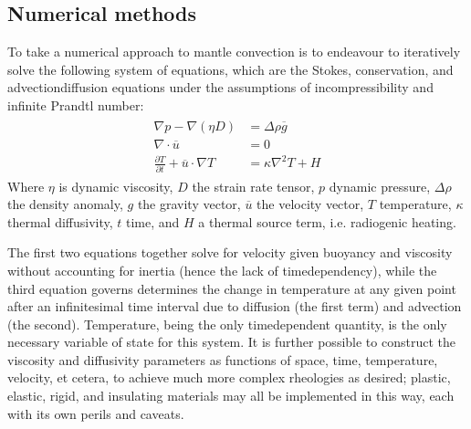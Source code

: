 \documentclass[letterpaper,10pt,english]{jupyterBook}
\begin{document}
\subsection{Numerical methods}
\label{\detokenize{content/chapter_02_methods/section2:numerical-methods}}
\sphinxAtStartPar
To take a numerical approach to mantle convection is to endeavour to iteratively solve the following system of equations, which are the Stokes, conservation, and advection\sphinxhyphen{}diffusion equations under the assumptions of incompressibility and infinite Prandtl number:
\begin{equation*}
\begin{split} \begin{align*}
\nabla p - \nabla \left( \eta D \right) &= \Delta \rho \overline{g} \\
\nabla \cdot \overline{u} &= 0 \\
\frac{\partial T}{\partial t} + \overline{u} \cdot \nabla T &= \kappa \nabla^2 T + H
\end{align*} \end{split}
\end{equation*}
\sphinxAtStartPar
Where \(\eta\) is dynamic viscosity, \(D\) the strain rate tensor, \(p\) dynamic pressure, \(\Delta\rho\) the density anomaly, \(g\) the gravity vector, \(\overline{u}\) the velocity vector, \(T\) temperature, \(\kappa\) thermal diffusivity, \(t\) time, and \(H\) a thermal source term, i.e. radiogenic heating.

\sphinxAtStartPar
The first two equations together solve for velocity given buoyancy and viscosity without accounting for inertia (hence the lack of time\sphinxhyphen{}dependency), while the third equation governs determines the change in temperature at any given point after an infinitesimal time interval due to diffusion (the first term) and advection (the second). Temperature, being the only time\sphinxhyphen{}dependent quantity, is the only necessary variable of state for this system. It is further possible to construct the viscosity and diffusivity parameters as functions of space, time, temperature, velocity, et cetera, to achieve much more complex rheologies as desired; plastic, elastic, rigid, and insulating materials may all be implemented in this way, each with its own perils and caveats.
\end{document}
